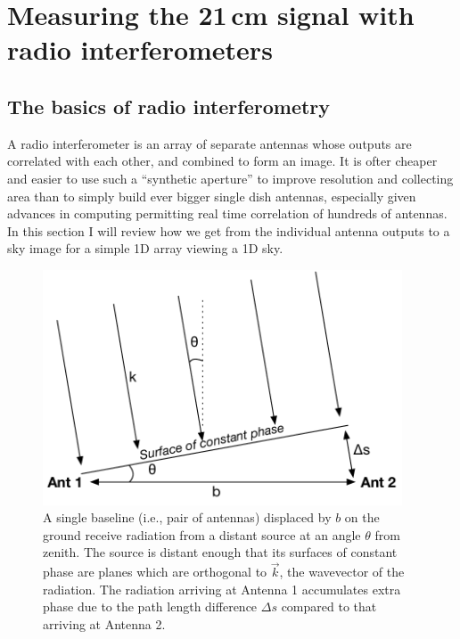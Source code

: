 \section{Measuring the 21\,cm signal with radio interferometers}

\subsection{The basics of radio interferometry}

A radio interferometer is an array of separate antennas whose outputs are correlated with each other, and combined to form an image. It is ofter cheaper and easier to use such a ``synthetic aperture'' to improve resolution and collecting area than to simply build ever bigger single dish antennas, especially given advances in computing permitting real time correlation of hundreds of antennas. In this section I will review how we get from the individual antenna outputs to a sky image for a simple 1D array viewing a 1D sky.

\begin{figure}[h]
    \centering
    \includegraphics[width=0.95\textwidth]{chap0_intro/radio_interferometer_diagram.pdf}
    \caption[Diagram of a two element radio interferometer]{A single baseline (i.e., pair of antennas) displaced by $b$ on the ground receive radiation from a distant source at an angle $\theta$ from zenith. The source is distant enough that its surfaces of constant phase are planes which are orthogonal to $\vec{k}$, the wavevector of the radiation. The radiation arriving at Antenna 1 accumulates extra phase due to the path length difference $\Delta s$ compared to that arriving at Antenna 2.}
    \label{fig:radiointerferometerdiagram}
\end{figure}

